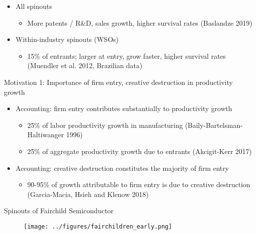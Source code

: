 \documentclass[english,usenames,dvipsnames]{beamer}
\begin{document}
\appendix



\begin{frame}\label{spinouts_facts_from_literature}
\hyperlink{motivation_spillovers}{}
\begin{itemize}
\item All spinouts
\begin{itemize}
\item More patents / R\&D, sales growth, higher survival rates (Baslandze 2019) 
\end{itemize}
\item Within-industry spinouts (WSOs)
\begin{itemize}
\item 15\% of entrants; larger at entry, grow faster, higher survival rates (Muendler et al. 2012, Brazilian data)
\end{itemize}
\end{itemize}
\end{frame}

\begin{frame}{Motivation 1: Importance of firm entry, creative destruction in productivity growth}
\begin{itemize}
	\item Accounting: firm entry contributes substantially to productivity growth
	\begin{itemize}
		\item 25\% of labor productivity growth in manufacturing (Baily-Bartelsman-Haltiwanger 1996)
		\item 25\% of aggregate productivity growth due to entrants (Akcigit-Kerr 2017)
	\end{itemize}
	\item Accounting: creative destruction constitutes the majority of firm entry
	\begin{itemize}
		\item 90-95\% of growth attributable to firm entry is due to creative destruction (Garcia-Macia, Hsieh and Klenow 2018)
	\end{itemize}
\end{itemize}
\end{frame}

\begin{frame}{Spinouts of Fairchild Semiconductor}\label{fairchildren_early}
\begin{figure}
	\texttt{[image: ../figures/fairchildren\_early.png]}
\end{figure}
\end{frame}
\end{document}
